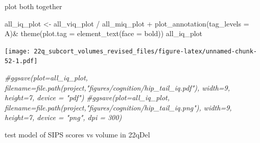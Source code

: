 \documentclass[
]{article}
\newenvironment{Shaded}{\begin{snugshade}}{\end{snugshade}}
\newcommand{\AttributeTok}[1]{\textcolor[rgb]{0.77,0.63,0.00}{#1}}
\newcommand{\CommentTok}[1]{\textcolor[rgb]{0.56,0.35,0.01}{\textit{#1}}}
\newcommand{\FunctionTok}[1]{\textcolor[rgb]{0.00,0.00,0.00}{#1}}
\newcommand{\NormalTok}[1]{#1}
\newcommand{\OtherTok}[1]{\textcolor[rgb]{0.56,0.35,0.01}{#1}}
\newcommand{\SpecialCharTok}[1]{\textcolor[rgb]{0.00,0.00,0.00}{#1}}
\newcommand{\StringTok}[1]{\textcolor[rgb]{0.31,0.60,0.02}{#1}}
\begin{document}
plot both together

\begin{Shaded}
\begin{Highlighting}[]
\NormalTok{all\_iq\_plot }\OtherTok{\textless{}{-}}\NormalTok{ all\_viq\_plot }\SpecialCharTok{/}\NormalTok{ all\_miq\_plot }\SpecialCharTok{+} \FunctionTok{plot\_annotation}\NormalTok{(}\AttributeTok{tag\_levels =} \StringTok{\textquotesingle{}A\textquotesingle{}}\NormalTok{)}\SpecialCharTok{\&} \FunctionTok{theme}\NormalTok{(}\AttributeTok{plot.tag =} \FunctionTok{element\_text}\NormalTok{(}\AttributeTok{face =} \StringTok{\textquotesingle{}bold\textquotesingle{}}\NormalTok{))}
\NormalTok{all\_iq\_plot}
\end{Highlighting}
\end{Shaded}

\texttt{[image: 22q\_subcort\_volumes\_revised\_files/figure-latex/unnamed-chunk-52-1.pdf]}

\begin{Shaded}
\begin{Highlighting}[]
\CommentTok{\#ggsave(plot=all\_iq\_plot, filename=file.path(project,"figures/cognition/hip\_tail\_iq.pdf"), width=9, height=7, device = "pdf")}
\CommentTok{\#ggsave(plot=all\_iq\_plot, filename=file.path(project,"figures/cognition/hip\_tail\_iq.png"), width=9, height=7, device = "png", dpi = 300)}
\end{Highlighting}
\end{Shaded}

test model of SIPS scores vs volume in 22qDel
\end{document}

